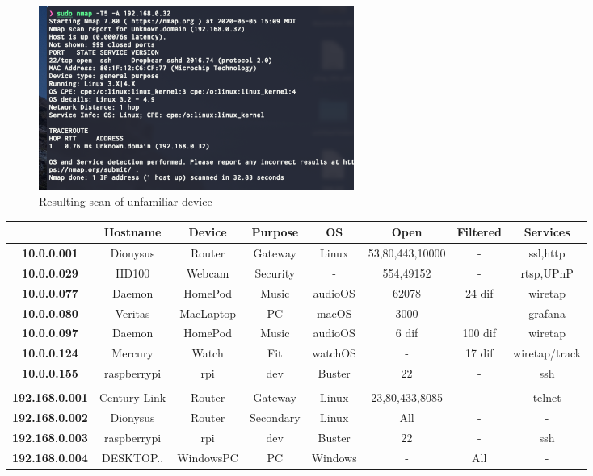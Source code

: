 \documentclass[10pt]{article}
\begin{document}
\begin{figure}[H]
\centering
\includegraphics[width=0.5\textwidth]{unknown.png}
\caption{Resulting scan of unfamiliar device}\label{unknown image}
\end{figure}

\begin{table}[H]
  \begin{center}
  \begin{tabular}{ | c | c | c | c | c | c | c | c | } 
  \hline
   & \textbf{Hostname} & \textbf{Device} & \textbf{Purpose} & \textbf{OS} & \textbf{Open} & \textbf{Filtered}  & \textbf{Services}  \\  
   \hline
   \textbf{10.0.0.001} & Dionysus & Router & Gateway & Linux & 53,80,443,10000 & - & ssl,http \\  
   \hline
   \textbf{10.0.0.029}  & HD100 & Webcam & Security & - & 554,49152 & - & rtsp,UPnP \\  
   \hline
   \textbf{10.0.0.077}  & Daemon & HomePod & Music & audioOS & 62078 & 24 dif & wiretap\\  
   \hline
   \textbf{10.0.0.080}  & Veritas & MacLaptop & PC & macOS & 3000 & - & grafana \\  
   \hline
   \textbf{10.0.0.097}  & Daemon & HomePod & Music & audioOS & 6 dif & 100 dif & wiretap \\  
   \hline
   \textbf{10.0.0.124}  & Mercury & Watch & Fit & watchOS & - & 17 dif & wiretap/track \\  
   \hline
   \textbf{10.0.0.155}  & raspberrypi & rpi & dev & Buster & 22 & - & ssh \\  
   \hline
   \textbf{}  &  &  &   &  &  &  & \\  
   \hline
   \textbf{192.168.0.001}  & Century Link & Router & Gateway & Linux & 23,80,433,8085 & - & telnet\\  
   \hline
   \textbf{192.168.0.002}  & Dionysus & Router & Secondary & Linux & All & - & - \\  
   \hline
   \textbf{192.168.0.003}  & raspberrypi & rpi & dev & Buster & 22 & - & ssh \\  
   \hline
   \textbf{192.168.0.004}  & DESKTOP.. & WindowsPC & PC & Windows & - & All & - \\  

\end{tabular}
\end{center}
\end{table}
\end{document}
